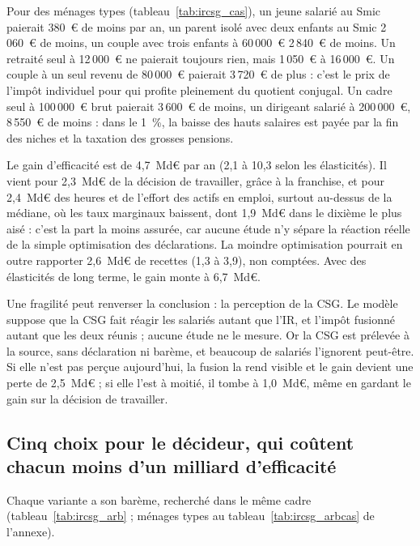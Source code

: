 
Pour des ménages types (tableau~\ref{tab:ircsg_cas}), un jeune salarié au Smic paierait 380~€ de moins par an, un parent
isolé avec deux enfants au Smic 2\,060~€ de moins, un couple avec trois enfants à 60\,000~€ 2\,840~€ de moins. Un
retraité seul à 12\,000~€ ne paierait toujours rien, mais 1\,050~€ à 16\,000~€. Un couple à un seul revenu de 80\,000~€
paierait 3\,720~€ de plus : c'est le prix de l'impôt individuel pour qui profite pleinement du quotient conjugal. Un
cadre seul à 100\,000~€ brut paierait 3\,600~€ de moins, un dirigeant salarié à 200\,000~€, 8\,550~€ de moins : dans le
1~\%, la baisse des hauts salaires est payée par la fin des niches et la taxation des grosses pensions.



Le gain d'efficacité est de 4,7~Md€ par an (2,1 à 10,3 selon les élasticités). Il vient pour 2,3~Md€ de la décision
de travailler, grâce à la franchise, et pour 2,4~Md€ des heures et de l'effort des actifs en emploi, surtout au-dessus
de la médiane, où les taux marginaux baissent, dont 1,9~Md€ dans le dixième le plus aisé : c'est la part la moins
assurée, car aucune étude n'y sépare la réaction réelle de la simple optimisation des déclarations. La moindre
optimisation pourrait en outre rapporter 2,6~Md€ de recettes (1,3 à 3,9), non comptées. Avec des élasticités de long
terme, le gain monte à 6,7~Md€.

Une fragilité peut renverser la conclusion : la perception de la CSG. Le modèle suppose que la CSG fait réagir les
salariés autant que l'IR, et l'impôt fusionné autant que les deux réunis ; aucune étude ne le mesure. Or la CSG est
prélevée à la source, sans déclaration ni barème, et beaucoup de salariés l'ignorent peut-être. Si elle n'est pas perçue
aujourd'hui, la fusion la rend visible et le gain devient une perte de 2,5~Md€ ; si elle l'est à moitié, il tombe à
1,0~Md€, même en gardant le gain sur la décision de travailler.

\subsection{Cinq choix pour le décideur, qui coûtent chacun moins d'un milliard d'efficacité}

Chaque variante a son barème, recherché dans le même cadre (tableau~\ref{tab:ircsg_arb} ; ménages types au
tableau~\ref{tab:ircsg_arbcas} de l'annexe).

